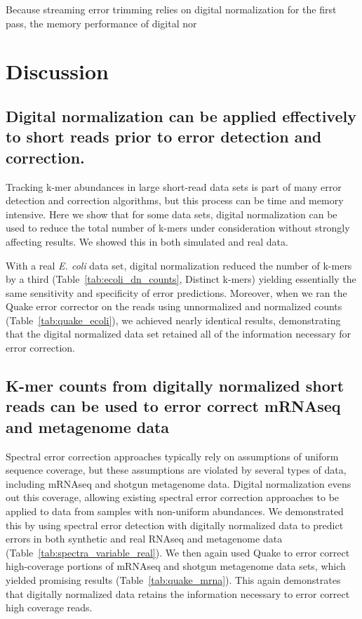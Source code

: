 \documentclass{article}
\begin{document}
  Because streaming error
trimming relies on digital normalization for the first pass, the
memory performance of digital nor

\section{Discussion}

\subsection{Digital normalization can be applied effectively to short reads prior to error detection and correction.}

Tracking k-mer abundances in large short-read data sets is part of
many error detection and correction algorithms, but this process can
be time and memory intensive.  Here we show that for some data sets,
digital normalization can be used to reduce the total number of k-mers
under consideration without strongly affecting results.
We showed this in both simulated and real data.

With a real {\em E. coli} data set, digital normalization reduced the
number of k-mers by a third (Table~\ref{tab:ecoli_dn_counts}, Distinct
k-mers) yielding essentially the same sensitivity and specificity of
error predictions.  Moreover, when we ran the Quake error corrector on
the reads using unnormalized and normalized counts
(Table~\ref{tab:quake_ecoli}), we achieved nearly identical results,
demonstrating that the digital normalized data set retained all of the
information necessary for error correction.

\subsection{K-mer counts from digitally normalized short reads can be used to error correct mRNAseq and metagenome data}

Spectral error correction approaches typically rely on assumptions of
uniform sequence coverage, but these assumptions are violated by
several types of data, including mRNAseq and shotgun metagenome data.
Digital normalization evens out this coverage, allowing existing
spectral error correction approaches to be applied to data from
samples with non-uniform abundances.  We demonstrated this by using
spectral error detection with digitally normalized data to predict
errors in both synthetic and real RNAseq and metagenome data
(Table~\ref{tab:spectra_variable_real}).  We then again used Quake to
error correct high-coverage portions of mRNAseq and shotgun metagenome
data sets, which yielded promising results
(Table~\ref{tab:quake_mrna}).  This again demonstrates that digitally
normalized data retains the information necessary to error correct
high coverage reads.
\end{document}
